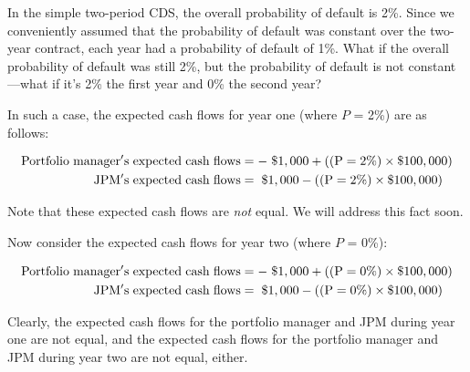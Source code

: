 \documentclass{jss}
\begin{document}
In the simple two-period CDS, the overall probability of default is 2\%. Since we conveniently assumed that the probability of default was constant over the two-year contract, each year had a probability of default of 1\%. What if the overall probability of default was still 2\%, but the probability of default is not constant---what if it's 2\% the first year and 0\% the second year?

In such a case, the expected cash flows for year one (where $P$ = 2\%) are as follows:

\begin{align}
   \rm Portfolio\hspace{3pt}manager's\hspace{3pt}expected\hspace{3pt}cash\hspace{3pt}flows &= \rm -\hspace{3pt}\$1,000 + ((P = 2\%) \times {\$100,000}) \\
    \rm JPM's\hspace{3pt}expected\hspace{3pt}cash\hspace{3pt}flows &= \rm \hspace{3pt}\$1,000 - ((P = 2\%) \times {\$100,000})
\end{align}

Note that these expected cash flows are \emph{not} equal. We will address this fact soon.

Now consider the expected cash flows for year two (where $P$ = 0\%):

\begin{align}
   \rm Portfolio\hspace{3pt}manager's\hspace{3pt}expected\hspace{3pt}cash\hspace{3pt}flows &= \rm -\hspace{3pt}\$1,000 + ((P = 0\%) \times {\$100,000}) \\
    \rm JPM's\hspace{3pt}expected\hspace{3pt}cash\hspace{3pt}flows &= \rm \hspace{3pt}\$1,000 - ((P = 0\%) \times {\$100,000}) 
\end{align}

Clearly, the expected cash flows for the portfolio manager and JPM during year one are not equal, and the expected cash flows for the portfolio manager and JPM during year two are not equal, either.
\end{document}
